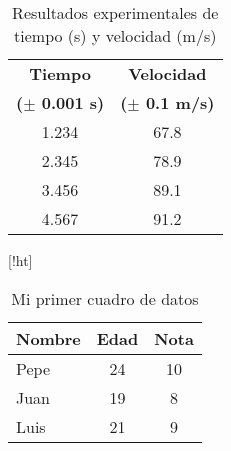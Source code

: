 \begin{table}[!ht]
\begin{center}
\begin{tabular}{|c|c|} \hline 
\textbf{Tiempo  } & \textbf{Velocidad} \\ 
\textbf{($\pm$ 0.001 s)} & \textbf{($\pm$ 0.1 m/s)} \\ \hline \hline
1.234 &
67.8
\\
\hline

2.345 &
78.9
\\
\hline

3.456 &
89.1
\\
\hline

4.567 &
91.2
\\
\hline

\end{tabular}
\end{center}
\caption{Resultados experimentales de tiempo (s) y velocidad (m/s)}
\label{tab:1}
\end{table}

\begin{table}
\end{table}
\begin{table}{[!ht]}
 \begin{center}
  \begin{tabular}{|l|c|c|}
   \hline
   Nombre & Edad & Nota \\ \hline
   Pepe   & 24   & 10   \\ \hline
   Juan   & 19   & 8    \\ \hline
   Luis   & 21   & 9    \\ \hline
\end{tabular}
\end{center}
\caption{Mi primer cuadro de datos}
\label{tab}
\end{table}

